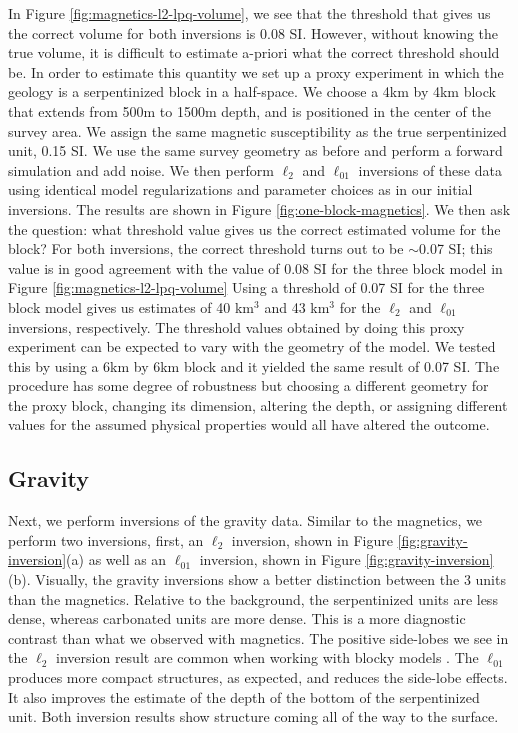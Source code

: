 \documentclass[
    paper,
  ]{geophysics}
\begin{document}
In Figure \ref{fig:magnetics-l2-lpq-volume}, we see that the threshold that gives us the correct volume for both inversions is 0.08 SI. However, without knowing the true volume, it is difficult to estimate a-priori what the correct threshold should be. In order to estimate this quantity we set up a proxy experiment  in which the geology is a serpentinized block in a half-space. We choose a 4km by 4km block that extends from 500m to 1500m depth, and is positioned in the center of the survey area. We assign the same magnetic susceptibility as the true serpentinized unit, 0.15 SI. We use the same survey geometry as before and perform a forward simulation and add noise. We then perform $\ell_2$ and $\ell_{01}$ inversions of these data using identical model regularizations and parameter choices as in our initial inversions.  The results are shown in Figure \ref{fig:one-block-magnetics}. We then ask the question: what threshold value gives us the correct estimated volume for the block? For both inversions, the correct threshold turns out to be $\sim$0.07 SI; this value is in good agreement with the value of 0.08 SI for the three block model in Figure \ref{fig:magnetics-l2-lpq-volume} Using a threshold of 0.07 SI for the three block model gives us estimates of 40 km$^3$ and 43 km$^3$ for the $\ell_2$ and $\ell_{01}$ inversions, respectively. The threshold values obtained by doing this proxy experiment can be expected to vary with the geometry of the model. We tested this by using a 6km by 6km block and it yielded the same result of 0.07 SI. The procedure has some degree of robustness but choosing a different geometry for the proxy block, changing its dimension, altering the depth, or assigning different values for the assumed physical properties would all have altered the outcome.





\subsection{Gravity}

Next, we perform inversions of the gravity data. Similar to the magnetics, we perform two inversions, first, an $\ell_2$ inversion, shown in Figure \ref{fig:gravity-inversion}(a) as well as an $\ell_{01}$ inversion, shown in Figure \ref{fig:gravity-inversion}(b). Visually, the gravity inversions show a better distinction between the 3 units than the magnetics. Relative to the background, the serpentinized units are less dense, whereas carbonated units are more dense. This is a more diagnostic contrast than what we observed with magnetics. The positive side-lobes we see in the $\ell_2$ inversion result are common when working with blocky models \citep{Oldenburg2005}. The $\ell_{01}$ produces more compact structures, as expected, and reduces the side-lobe effects. It also improves the estimate of the depth of the bottom of the serpentinized unit. Both inversion results show structure coming all of the way to the surface.
\end{document}
